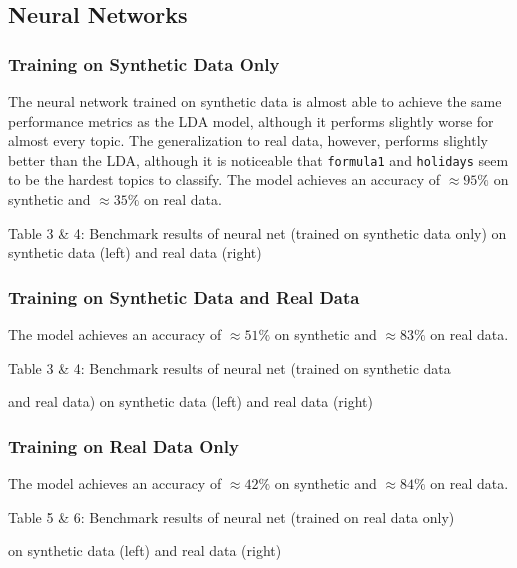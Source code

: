 \documentclass[11pt]{article}
\begin{document}
\subsection{Neural Networks}
\subsubsection{Training on Synthetic Data Only}
The neural network trained on synthetic data is almost able to achieve the same performance metrics as the LDA model, although it performs slightly worse for almost every topic. The generalization to real data, however, performs slightly better than the LDA, although it is noticeable that \texttt{formula1} and \texttt{holidays} seem to be the hardest topics to classify.
The model achieves an accuracy of $\approx 95\%$ on synthetic and $\approx 35\%$ on real data.

\begin{center}
	
\qquad

\end{center}
\begin{center}
Table 3 \& 4: Benchmark results of neural net (trained on synthetic data only) on synthetic data (left) and real data (right)
\end{center}




\subsubsection{Training on Synthetic Data and Real Data}

The model achieves an accuracy of $\approx 51\%$ on synthetic and $\approx 83\%$ on real data.
\begin{center}

\qquad

\end{center}
\begin{center}
Table 3 \& 4: Benchmark results of neural net (trained on synthetic data 

and real data) on synthetic data (left) and real data (right)
\end{center}


\subsubsection{Training on Real Data Only}
The model achieves an accuracy of $\approx 42\%$ on synthetic and $\approx 84\%$ on real data.
\begin{center}

\qquad

\end{center}
\begin{center}
Table 5 \& 6: Benchmark results of neural net (trained on real data only)

 on synthetic data (left) and real data (right)
\end{center}
\end{document}
